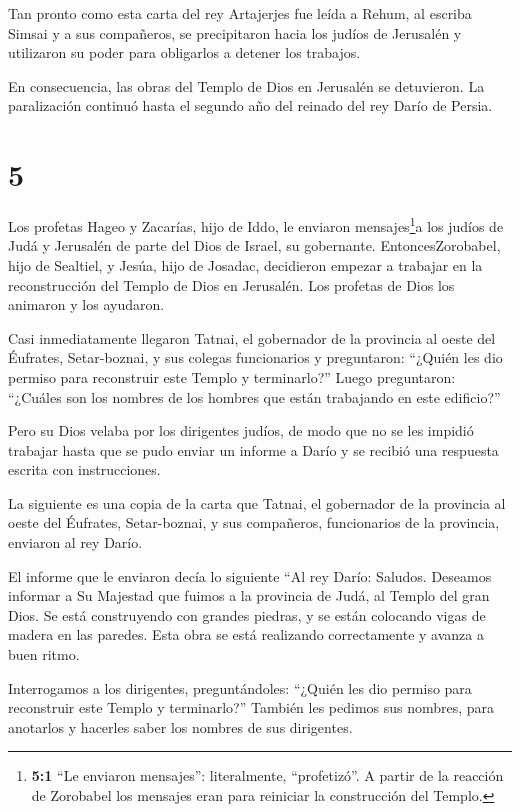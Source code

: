  Tan pronto como esta carta del rey Artajerjes fue leída a
Rehum, al escriba Simsai y a sus compañeros, se precipitaron hacia los
judíos de Jerusalén y utilizaron su poder para obligarlos a detener los
trabajos.

 En consecuencia, las obras del Templo de Dios en Jerusalén
se detuvieron. La paralización continuó hasta el segundo año del reinado
del rey Darío de Persia.

\hypertarget{section-4}{%
\section{5}\label{section-4}}

 Los profetas Hageo y Zacarías, hijo de Iddo, le enviaron
mensajes\footnote{\textbf{5:1} ``Le enviaron mensajes'': literalmente,
  ``profetizó''. A partir de la reacción de Zorobabel los mensajes eran
  para reiniciar la construcción del Templo.}a los judíos de Judá y
Jerusalén de parte del Dios de Israel, su gobernante. 
EntoncesZorobabel, hijo de Sealtiel, y Jesúa, hijo de Josadac,
decidieron empezar a trabajar en la reconstrucción del Templo de Dios en
Jerusalén. Los profetas de Dios los animaron y los ayudaron.

 Casi inmediatamente llegaron Tatnai, el gobernador de la
provincia al oeste del Éufrates, Setar-boznai, y sus colegas
funcionarios y preguntaron: ``¿Quién les dio permiso para reconstruir
este Templo y terminarlo?''  Luego preguntaron: ``¿Cuáles
son los nombres de los hombres que están trabajando en este edificio?''

 Pero su Dios velaba por los dirigentes judíos, de modo que
no se les impidió trabajar hasta que se pudo enviar un informe a Darío y
se recibió una respuesta escrita con instrucciones.

 La siguiente es una copia de la carta que Tatnai, el
gobernador de la provincia al oeste del Éufrates, Setar-boznai, y sus
compañeros, funcionarios de la provincia, enviaron al rey Darío.

 El informe que le enviaron decía lo siguiente ``Al rey
Darío: Saludos.  Deseamos informar a Su Majestad que fuimos
a la provincia de Judá, al Templo del gran Dios. Se está construyendo
con grandes piedras, y se están colocando vigas de madera en las
paredes. Esta obra se está realizando correctamente y avanza a buen
ritmo.

 Interrogamos a los dirigentes, preguntándoles: ``¿Quién les
dio permiso para reconstruir este Templo y terminarlo?'' 
También les pedimos sus nombres, para anotarlos y hacerles saber los
nombres de sus dirigentes.

